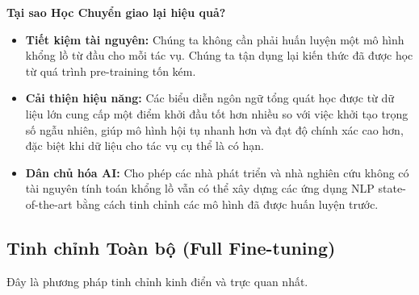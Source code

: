 \textbf{Tại sao Học Chuyển giao lại hiệu quả?}
\begin{itemize}
    \item \textbf{Tiết kiệm tài nguyên:} Chúng ta không cần phải huấn luyện một mô hình khổng lồ từ đầu cho mỗi tác vụ. Chúng ta tận dụng lại kiến thức đã được học từ quá trình pre-training tốn kém.
    \item \textbf{Cải thiện hiệu năng:} Các biểu diễn ngôn ngữ tổng quát học được từ dữ liệu lớn cung cấp một điểm khởi đầu tốt hơn nhiều so với việc khởi tạo trọng số ngẫu nhiên, giúp mô hình hội tụ nhanh hơn và đạt độ chính xác cao hơn, đặc biệt khi dữ liệu cho tác vụ cụ thể là có hạn.
    \item \textbf{Dân chủ hóa AI:} Cho phép các nhà phát triển và nhà nghiên cứu không có tài nguyên tính toán khổng lồ vẫn có thể xây dựng các ứng dụng NLP state-of-the-art bằng cách tinh chỉnh các mô hình đã được huấn luyện trước.
\end{itemize}

\subsection{Tinh chỉnh Toàn bộ (Full Fine-tuning)}
\label{ssec:full_finetuning}

Đây là phương pháp tinh chỉnh kinh điển và trực quan nhất.

